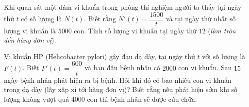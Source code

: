 \begin{ex}%
Khi quan sát một đám vi khuẩn trong phòng thí nghiệm người ta thấy tại ngày thứ $t$ có số lượng là $N(t)$. Biết rằng $N'(t)=\dfrac{1500}{t}$ và tại ngày thứ nhất số lượng vi khuẩn là $5000$ con. Tính số lượng vi khuẩn tại ngày thứ $12$ (\textit{làm tròn đến hàng đơn vị}).
\end{ex}

\begin{ex}%
Vi khuẩn HP (Helicobacter pylori) gây đau dạ dày, tại ngày thứ $t$ với số lượng là $F(t)$. Biết $F'(t)=\dfrac{600}{t}$ và ban đầu bệnh nhân có $2000$ con vi khuẩn. Sau $15$ ngày bệnh nhân phát hiện ra bị bệnh. Hỏi khi đó có bao nhiêu con vi khuẩn trong dạ dày (lấy xấp xỉ tới hàng đơn vị)? Biết rằng nếu phát hiện sớm khi số lượng không vượt quá $4000$ con thì bệnh nhân sẽ được cứu chữa.
\end{ex}

